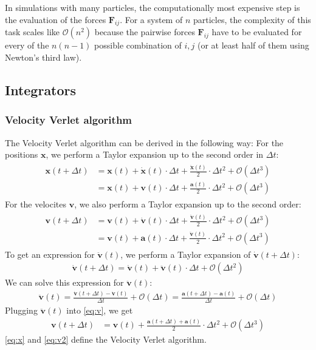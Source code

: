 \documentclass[a4paper,10pt,bibtotoc]{scrartcl}
\begin{document}
\noindent In simulations with many particles, the computationally most expensive step is the evaluation of the forces $\mathbf{F}_{ij}$. For a system of $n$ particles, the complexity of this task scales like $\mathcal{O}\left(n^2\right)$ because the pairwise forces $\mathbf{F}_{ij}$ have to be evaluated for every of the $n(n-1)$ possible combination of $i,j$ (or at least half of them using Newton's third law).

\subsection{Integrators}
\subsubsection{Velocity Verlet algorithm}
The Velocity Verlet algorithm can be derived in the following way: For the positions $\mathbf{x}$, we perform a Taylor expansion up to the second order in $\Delta t$:
\begin{align}
\begin{split}
 \mathbf{x}(t + \Delta t) &= \mathbf{x}(t) + \dot{\mathbf{x}}(t)\cdot \Delta t + \frac{\ddot{\mathbf{x}}(t)}{2}\cdot \Delta t^2 + \mathcal{O}(\Delta t^3)\\
 &= \mathbf{x}(t) + \mathbf{v}(t)\cdot \Delta t + \frac{\mathbf{a}(t)}{2}\cdot \Delta t^2 + \mathcal{O}(\Delta t^3)
 \end{split}
 \label{eq:x}
\end{align}
For the velocites $\mathbf{v}$, we also perform a Taylor expansion up to the second order:
\begin{align}
\begin{split}
 \mathbf{v}(t + \Delta t) &= \mathbf{v}(t) + \dot{\mathbf{v}}(t)\cdot \Delta t + \frac{\ddot{\mathbf{v}}(t)}{2}\cdot \Delta t^2 + \mathcal{O}(\Delta t^3)\\
 &=\mathbf{v}(t) + \mathbf{a}(t)\cdot \Delta t + \frac{\ddot{\mathbf{v}}(t)}{2}\cdot \Delta t^2 + \mathcal{O}(\Delta t^3)
\end{split}
 \label{eq:v}
\end{align}
To get an expression for $\ddot{\mathbf{v}}(t)$, we perform a Taylor expansion of $\dot{\mathbf{v}}(t + \Delta t)$:
\begin{align}
 \dot{\mathbf{v}}(t + \Delta t) = \dot{\mathbf{v}}(t) + \ddot{\mathbf{v}}(t)\cdot \Delta t + \mathcal{O}(\Delta t^2)
\end{align}
We can solve this expression for $\ddot{\mathbf{v}}(t)$:
\begin{align}
 \ddot{\mathbf{v}}(t) = \frac{\dot{\mathbf{v}}(t+\Delta t) - \dot{\mathbf{v}}(t)}{\Delta t} + \mathcal{O}(\Delta t) = \frac{\mathbf{a}(t+\Delta t) - \mathbf{a}(t)}{\Delta t} + \mathcal{O}(\Delta t)
\end{align}
Plugging $\ddot{\mathbf{v}}(t)$ into \autoref{eq:v}, we get
\begin{align}
 \mathbf{v}(t + \Delta t) &=\mathbf{v}(t) + \frac{\mathbf{a}(t+\Delta t) + \mathbf{a}(t)}{2} \cdot\Delta t^2 + \mathcal{O}(\Delta t^3)
 \label{eq:v2}
\end{align}
\autoref{eq:x} and \autoref{eq:v2} define the Velocity Verlet algorithm.
\end{document}
